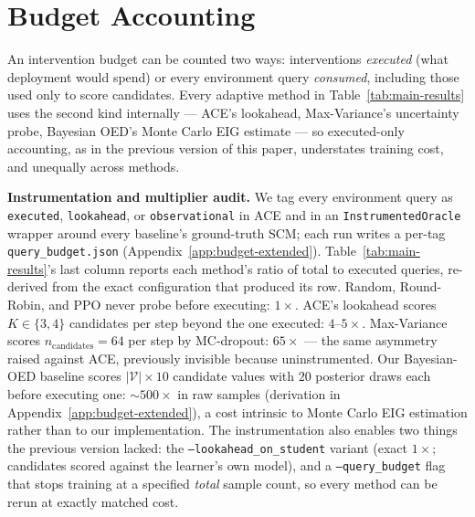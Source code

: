 \documentclass[twoside]{article}
\theoremstyle{plain}
\theoremstyle{definition}
\theoremstyle{remark}
\begin{document}
\section{Budget Accounting}
\label{sec:budget}

An intervention budget can be counted two ways: interventions \emph{executed} (what deployment would spend) or every environment query \emph{consumed}, including those used only to score candidates. Every adaptive method in Table~\ref{tab:main-results} uses the second kind internally --- ACE's lookahead, Max-Variance's uncertainty probe, Bayesian OED's Monte Carlo EIG estimate --- so executed-only accounting, as in the previous version of this paper, understates training cost, and unequally across methods.

\textbf{Instrumentation and multiplier audit.} We tag every environment query as \texttt{executed}, \texttt{lookahead}, or \texttt{observational} in ACE and in an \texttt{InstrumentedOracle} wrapper around every baseline's ground-truth SCM; each run writes a per-tag \texttt{query\_budget.json} (Appendix~\ref{app:budget-extended}). Table~\ref{tab:main-results}'s last column reports each method's ratio of total to executed queries, re-derived from the exact configuration that produced its row. Random, Round-Robin, and PPO never probe before executing: $1\times$. ACE's lookahead scores $K\in\{3,4\}$ candidates per step beyond the one executed: $4$--$5\times$. Max-Variance scores $n_\text{candidates}=64$ per step by MC-dropout: $65\times$ --- the same asymmetry raised against ACE, previously invisible because uninstrumented. Our Bayesian-OED baseline scores $|\mathcal V|\times10$ candidate values with $20$ posterior draws each before executing one: $\sim\!500\times$ in raw samples (derivation in Appendix~\ref{app:budget-extended}), a cost intrinsic to Monte Carlo EIG estimation rather than to our implementation. The instrumentation also enables two things the previous version lacked: the \texttt{--lookahead\_on\_student} variant (exact $1\times$; candidates scored against the learner's own model), and a \texttt{--query\_budget} flag that stops training at a specified \emph{total} sample count, so every method can be rerun at exactly matched cost.
\end{document}
